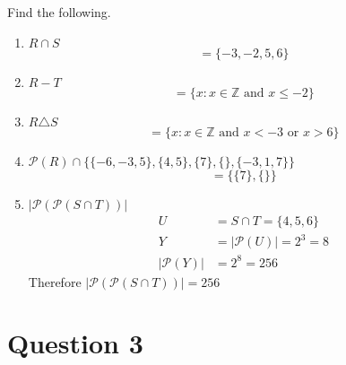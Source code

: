\documentclass[11pt]{article}
\begin{document}
Find the following.

\begin{enumerate}[label=(\roman*)]
	\item $R \cap S$
	$$= \{ -3,-2,5,6 \}$$
	\item $R - T$
	$$= \{x: x \in \mathbb{Z} \text{ and } x \leq -2 \} $$
	\item $R \triangle S$
	$$= \{x: x \in \mathbb{Z} \text{ and } x < -3 \text{ or } x > 6 \}$$
	\item $\mathcal{P} (R) \cap \{ \{-6,-3,5\},\{4,5\},\{7\},\{\},\{-3,1,7\}\}$
	$$= \{\{7\},\{\}\}$$
	\item $|\mathcal{P}(\mathcal{P}(S \cap T))|$
	\begin{align*}
		U &= S \cap T = \{4,5,6\} \\
		Y &= |\mathcal{P}(U)| = 2^3 = 8 \\
		|\mathcal{P}(Y)| &= 2^8 = 256
	\end{align*}
	Therefore $|\mathcal{P}(\mathcal{P}(S \cap T))| = 256$
\end{enumerate}

\break
\section*{Question 3}
\end{document}
